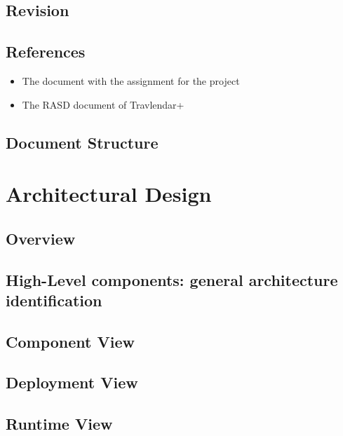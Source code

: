 \documentclass{article}
\begin{document}
\subsection{Revision}




\subsection{References}
\begin{itemize}
	\item The document with the assignment for the project
	\item The RASD document of Travlendar+
\end{itemize}
\subsection{Document Structure}


\clearpage
\section{Architectural Design}

\subsection{Overview}\label{overview}


\clearpage
\subsection{High-Level components: general architecture identification}\label{higharch}


\clearpage

\subsection{Component View}\label{componentview}


\subsection{Deployment View}\label{deploymentview}

\subsection{Runtime View}\label{runtimeview}
\end{document}
